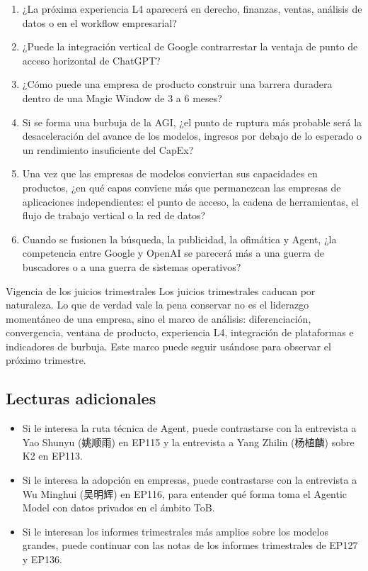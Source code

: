 \documentclass[a4paper]{article}
\begin{document}
\begin{enumerate}
\item ¿La próxima experiencia L4 aparecerá en derecho, finanzas, ventas, análisis de datos o en el workflow empresarial?
\item ¿Puede la integración vertical de Google contrarrestar la ventaja de punto de acceso horizontal de ChatGPT?
\item ¿Cómo puede una empresa de producto construir una barrera duradera dentro de una Magic Window de 3 a 6 meses?
\item Si se forma una burbuja de la AGI, ¿el punto de ruptura más probable será la desaceleración del avance de los modelos, ingresos por debajo de lo esperado o un rendimiento insuficiente del CapEx?
\item Una vez que las empresas de modelos conviertan sus capacidades en productos, ¿en qué capas conviene más que permanezcan las empresas de aplicaciones independientes: el punto de acceso, la cadena de herramientas, el flujo de trabajo vertical o la red de datos?
\item Cuando se fusionen la búsqueda, la publicidad, la ofimática y Agent, ¿la competencia entre Google y OpenAI se parecerá más a una guerra de buscadores o a una guerra de sistemas operativos?
\end{enumerate}

\begin{warningbox}{Vigencia de los juicios trimestrales}
Los juicios trimestrales caducan por naturaleza. Lo que de verdad vale la pena conservar no es el liderazgo momentáneo de una empresa, sino el marco de análisis: diferenciación, convergencia, ventana de producto, experiencia L4, integración de plataformas e indicadores de burbuja. Este marco puede seguir usándose para observar el próximo trimestre.
\end{warningbox}

\subsection{Lecturas adicionales}

\begin{itemize}
\item Si le interesa la ruta técnica de Agent, puede contrastarse con la entrevista a Yao Shunyu (姚顺雨) en EP115 y la entrevista a Yang Zhilin (杨植麟) sobre K2 en EP113.
\item Si le interesa la adopción en empresas, puede contrastarse con la entrevista a Wu Minghui (吴明辉) en EP116, para entender qué forma toma el Agentic Model con datos privados en el ámbito ToB.
\item Si le interesan los informes trimestrales más amplios sobre los modelos grandes, puede continuar con las notas de los informes trimestrales de EP127 y EP136.
\end{itemize}
\end{document}
